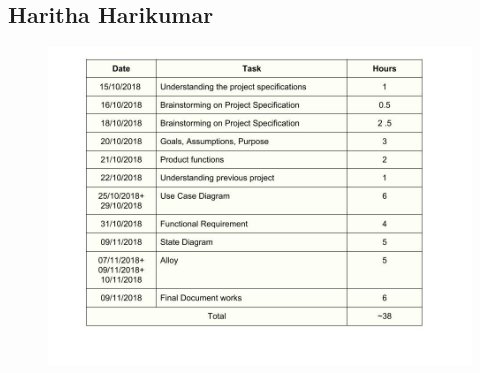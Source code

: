 \subsection{Haritha Harikumar}
\begin{figure}[ht]
	\begin{center}
		\includegraphics[width=\textwidth]{./Diagrams/effort.jpg}
	\end{center}
\end{figure}